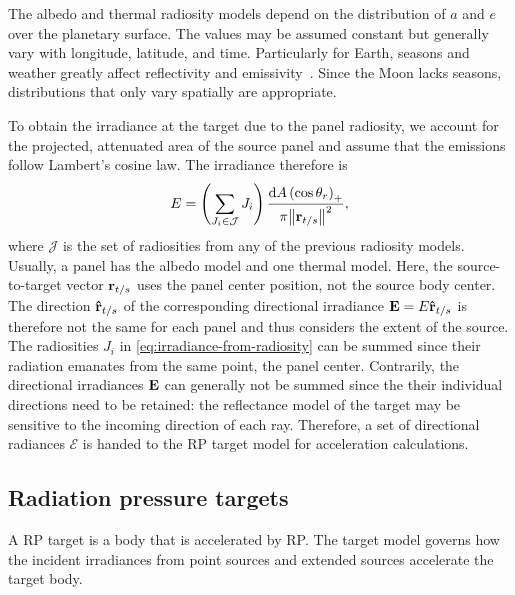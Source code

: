 The albedo and thermal radiosity models depend on the distribution of $a$ and $e$ over the planetary surface. The values may be assumed constant but generally vary with longitude, latitude, and time. Particularly for Earth, seasons and weather greatly affect reflectivity and emissivity~\cite{Goode2001}. Since the Moon lacks seasons, distributions that only vary spatially are appropriate.

To obtain the irradiance at the target due to the panel radiosity, we account for the projected, attenuated area of the source panel and assume that the emissions follow Lambert's cosine law. The irradiance therefore is
\begin{align}
    \label{eq:irradiance-from-radiosity}
    E = \left(\sum_{J_i \in \mathcal{J}} J_i\right) \frac{\dd{A} \left(\cos\theta_r\right)_+}{\pi\norm{\vb r_{t/s}}^2},
\end{align}
where $\mathcal{J}$ is the set of radiosities from any of the previous radiosity models. Usually, a panel has the albedo model and one thermal model. Here, the source-to-target vector $\vb r_{t/s}$ uses the panel center position, not the source body center. The direction $\vu r_{t/s}$ of the corresponding directional irradiance $\vb E = E \vu r_{t/s}$  is therefore not the same for each panel and thus considers the extent of the source. The radiosities $J_i$ in \cref{eq:irradiance-from-radiosity} can be summed since their radiation emanates from the same point, the panel center. Contrarily, the directional irradiances $\vb E$ can generally not be summed since the their  individual directions need to be retained: the reflectance model of the target may be sensitive to the incoming direction of each ray. Therefore, a set of directional radiances $\mathcal{E}$ is handed to the \gls{RP} target model for acceleration calculations.




\subsection{Radiation pressure targets}
\label{subsec:radiation-pressure-targets}

A \gls{RP} target is a body that is accelerated by \gls{RP}. The target model governs how the incident irradiances from point sources and extended sources accelerate the target body.


